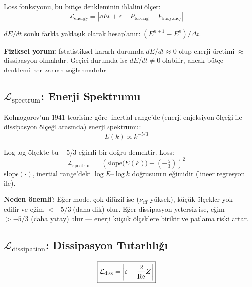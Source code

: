 Loss fonksiyonu, bu bütçe denkleminin ihlalini ölçer:
\begin{equation}
    \boxed{
        \mathcal{L}_{\text{energy}} = \left|\dd{E}{t} + \varepsilon - P_{\text{forcing}} - P_{\text{buoyancy}}\right|
    }
    \label{eq:loss_energy}
\end{equation}

$dE/dt$ sonlu farkla yaklaşık olarak hesaplanır: $(E^{n+1} - E^n) / \Delta t$.

\textbf{Fiziksel yorum:} \"{I}statistiksel kararlı durumda $dE/dt \approx 0$ olup enerji üretimi $\approx$ dissipasyon olmalıdır. Geçici durumda ise $dE/dt \neq 0$ olabilir, ancak bütçe denklemi her zaman sağlanmalıdır.


\subsection{$\mathcal{L}_{\text{spectrum}}$: Enerji Spektrumu}
\label{sec:loss_spectrum}

Kolmogorov'un 1941 teorisine göre, inertial range'de (enerji enjeksiyon ölçeği ile dissipasyon ölçeği arasında) enerji spektrumu:
\begin{equation}
    E(k) \propto k^{-5/3}
    \label{eq:kolmogorov_spectrum}
\end{equation}

Log-log ölçekte bu $-5/3$ eğimli bir doğru demektir. Loss:
\begin{equation}
    \boxed{
        \mathcal{L}_{\text{spectrum}} = \left(\text{slope}\big(E(k)\big) - \left(-\tfrac{5}{3}\right)\right)^2
    }
    \label{eq:loss_spectrum}
\end{equation}
$\text{slope}(\cdot)$, inertial range'deki $\log E$--$\log k$ doğrusunun eğimidir (lineer regresyon ile).

\textbf{Neden önemli?} Eğer model çok difüzif ise ($\nu_{\text{eff}}$ yüksek), küçük ölçekler yok edilir ve eğim $< -5/3$ (daha dik) olur. Eğer dissipasyon yetersiz ise, eğim $> -5/3$ (daha yatay) olur --- enerji küçük ölçeklere birikir ve patlama riski artar.


\subsection{$\mathcal{L}_{\text{dissipation}}$: Dissipasyon Tutarlılığı}
\label{sec:loss_dissipation}

\begin{equation}
    \boxed{
        \mathcal{L}_{\text{diss}} = \left|\varepsilon - \frac{2}{\mathrm{Re}} Z\right|
    }
    \label{eq:loss_diss}
\end{equation}

